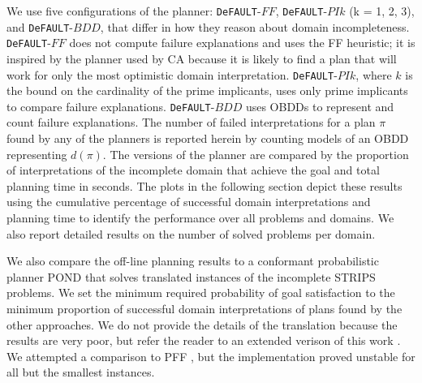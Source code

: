 \documentclass[letterpaper]{article}
\def\FFRISKY{{\tt DeFAULT}}
\def\citep#1{\cite{#1}}
\begin{document}
We use five configurations of the planner: \FFRISKY{}-$FF$, \FFRISKY{}-$PIk$ (k
= 1, 2, 3), and \FFRISKY{}-$BDD$, that differ in how they reason about domain
incompleteness.  \FFRISKY{}-$FF$ does not compute failure explanations and uses
the FF heuristic;  it is inspired by the planner used by CA because it is likely
to find a plan that will work for only the most optimistic domain
interpretation.  \FFRISKY{}-$PIk$, where $k$ is the bound on the cardinality of
the prime implicants, uses only prime implicants to compare failure
explanations.  \FFRISKY{}-$BDD$ uses OBDDs to represent and count failure
explanations.  The number of failed interpretations for a plan $\pi$ found by
any of the planners is reported herein by counting models of an OBDD
representing $d(\pi)$. The versions of the planner are compared by the
proportion of interpretations of the incomplete domain that achieve the goal and
total planning time in seconds. The plots in the following section depict these
results using the cumulative percentage of successful domain interpretations and
planning time to identify the performance over all problems and domains.  We
also report detailed results on the number of solved problems per domain.

We also compare the off-line planning results to a conformant probabilistic
planner POND \citep{aij-mclug} that solves translated instances of the incomplete
STRIPS problems.  We set the minimum required probability of goal satisfaction
to the minimum proportion of successful domain interpretations of plans found by
the other approaches. We do not provide the details of the translation because
the results are very poor, but refer the reader to an extended verison of this work \citep{USU-CS-TR-11-001}.  We attempted a comparison to PFF \citep{pff}, but the implementation proved unstable for all but the smallest instances. 
\end{document}
